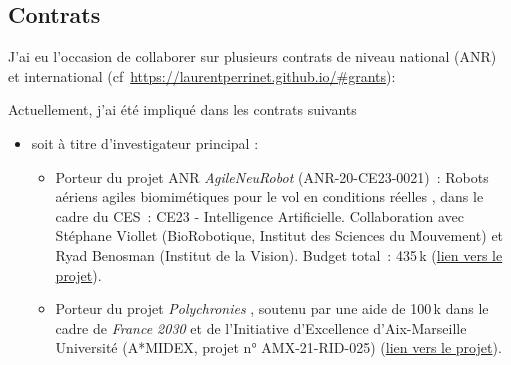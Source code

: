 \documentclass[10pt,french,a4paper,oneside]{article}%
\begin{document}
\subsection{Contrats} %
J'ai eu l'occasion de collaborer sur plusieurs contrats de niveau national (ANR) et international (cf~\url{https://laurentperrinet.github.io/#grants}):


Actuellement, j'ai été impliqué dans les contrats suivants
\begin{itemize}
\item soit à titre d'investigateur principal :
\begin{itemize}

	\item Porteur du projet ANR \og \textit{AgileNeuRobot} \fg{} (ANR-20-CE23-0021)~: \og Robots aériens agiles biomimétiques pour le vol en conditions réelles \fg{}, dans le cadre du CES~: CE23 - Intelligence Artificielle. Collaboration avec Stéphane Viollet (BioRobotique, Institut des Sciences du Mouvement) et Ryad Benosman (Institut de la Vision). Budget total~: 435\,k\texteuro{} (\href{https://laurentperrinet.github.io/grant/anr-anr/}{lien vers le projet}).

	\item Porteur du projet \og \textit{Polychronies} \fg{}, soutenu par une aide de 100\,k\texteuro{} dans le cadre de \textit{France 2030} et de l'Initiative d'Excellence d'Aix-Marseille Université (A*MIDEX, projet n° AMX-21-RID-025) (\href{https://laurentperrinet.github.io/grant/polychronies/}{lien vers le projet}).
\end{itemize}


\end{itemize}
\end{document}
